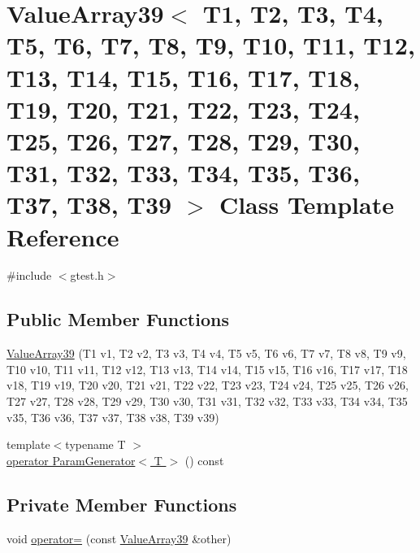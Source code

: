 \hypertarget{classtesting_1_1internal_1_1ValueArray39}{\section{\-Value\-Array39$<$ \-T1, \-T2, \-T3, \-T4, \-T5, \-T6, \-T7, \-T8, \-T9, \-T10, \-T11, \-T12, \-T13, \-T14, \-T15, \-T16, \-T17, \-T18, \-T19, \-T20, \-T21, \-T22, \-T23, \-T24, \-T25, \-T26, \-T27, \-T28, \-T29, \-T30, \-T31, \-T32, \-T33, \-T34, \-T35, \-T36, \-T37, \-T38, \-T39 $>$ \-Class \-Template \-Reference}
\label{d5/d0c/classtesting_1_1internal_1_1ValueArray39}
}


{\ttfamily \#include $<$gtest.\-h$>$}

\subsection*{\-Public \-Member \-Functions}
\begin{DoxyCompactItemize}
\item 
\hyperlink{classtesting_1_1internal_1_1ValueArray39_a97bdad4eb0fb772ca0951d6d04029809}{\-Value\-Array39} (\-T1 v1, \-T2 v2, \-T3 v3, \-T4 v4, \-T5 v5, \-T6 v6, \-T7 v7, \-T8 v8, \-T9 v9, \-T10 v10, \-T11 v11, \-T12 v12, \-T13 v13, \-T14 v14, \-T15 v15, \-T16 v16, \-T17 v17, \-T18 v18, \-T19 v19, \-T20 v20, \-T21 v21, \-T22 v22, \-T23 v23, \-T24 v24, \-T25 v25, \-T26 v26, \-T27 v27, \-T28 v28, \-T29 v29, \-T30 v30, \-T31 v31, \-T32 v32, \-T33 v33, \-T34 v34, \-T35 v35, \-T36 v36, \-T37 v37, \-T38 v38, \-T39 v39)
\item 
{\footnotesize template$<$typename T $>$ }\\\hyperlink{classtesting_1_1internal_1_1ValueArray39_a08ef46fa12c9dd8ef6fc630baeea89b7}{operator Param\-Generator$<$ T $>$} () const 
\end{DoxyCompactItemize}
\subsection*{\-Private \-Member \-Functions}
\begin{DoxyCompactItemize}
\item 
void \hyperlink{classtesting_1_1internal_1_1ValueArray39_ad884aa50f2a9a9013299ae74649213d6}{operator=} (const \hyperlink{classtesting_1_1internal_1_1ValueArray39}{\-Value\-Array39} \&other)
\end{DoxyCompactItemize}
